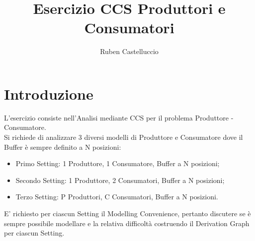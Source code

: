 \documentclass{article}
\title{Esercizio CCS Produttori e Consumatori}
\author{Ruben Castelluccio}
\begin{document}
\maketitle
\section{Introduzione}
L'esercizio consiste nell'Analisi mediante CCS per il problema Produttore - Consumatore.
\\ Si richiede di analizzare 3 diversi modelli di Produttore e Consumatore dove il Buffer è sempre definito a N posizioni:
\begin{itemize}
    \item Primo Setting: 1 Produttore, 1 Consumatore, Buffer a N posizioni;
    \item Secondo Setting: 1 Produttore, 2 Consumatori, Buffer a N posizioni;
    \item Terzo Setting: P Produttori, C Consumatori, Buffer a N posizioni.
\end{itemize}
E' richiesto per ciascun Setting il Modelling Convenience, pertanto discutere se è sempre possibile modellare e la relativa difficoltà costruendo il Derivation Graph per ciascun Setting.
\clearpage
\end{document}
